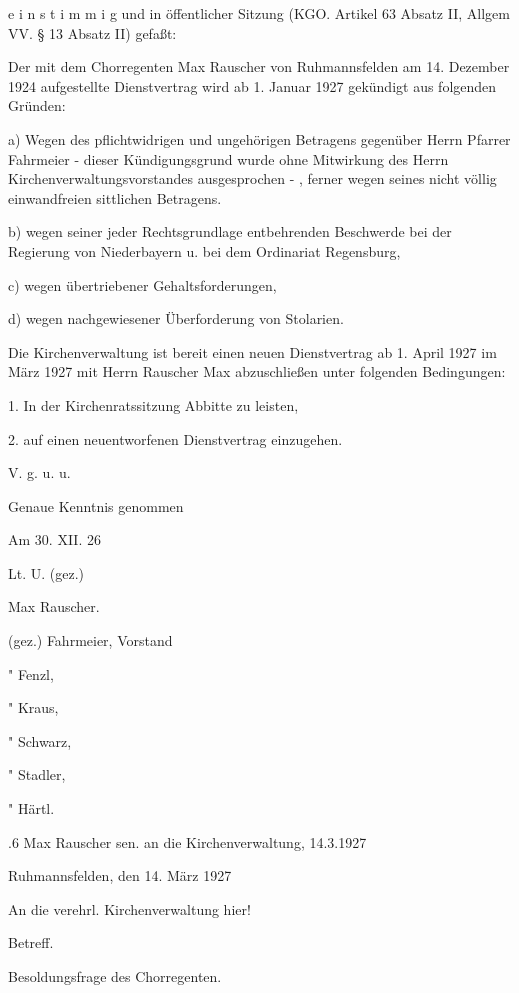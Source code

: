 \documentclass[12pt,a4pager]{book}
\begin{document}
e i n s t i m m i g und in öffentlicher Sitzung (KGO. Artikel 63 Absatz II,
Allgem VV. § 13 Absatz II) gefaßt:



Der mit dem Chorregenten Max Rauscher von Ruhmannsfelden am 14. Dezember 1924
aufgestellte Dienstvertrag wird ab 1. Januar 1927 gekündigt aus folgenden
Gründen:

a) Wegen des pflichtwidrigen und ungehörigen Betragens gegenüber Herrn Pfarrer
Fahrmeier - dieser  Kündigungsgrund wurde ohne Mitwirkung des Herrn
Kirchenverwaltungsvorstandes ausgesprochen - , ferner wegen seines nicht völlig
einwandfreien sittlichen Betragens.

b) wegen seiner jeder Rechtsgrundlage entbehrenden Beschwerde bei der Regierung
von Niederbayern u. bei dem Ordinariat Regensburg,

c) wegen übertriebener Gehaltsforderungen,

d) wegen nachgewiesener Überforderung von Stolarien.

Die Kirchenverwaltung ist bereit einen neuen Dienstvertrag ab 1. April 1927 im
März 1927 mit Herrn Rauscher Max abzuschließen unter folgenden Bedingungen:

1. In der Kirchenratssitzung Abbitte zu leisten,

2. auf einen neuentworfenen Dienstvertrag einzugehen.

V. g. u. u.



Genaue Kenntnis genommen

Am 30. XII. 26

Lt. U. (gez.)

Max Rauscher.



(gez.) Fahrmeier, Vorstand

   "     Fenzl,

   "     Kraus,

   "     Schwarz,

   "     Stadler,

   "     Härtl.

.6 Max Rauscher sen. an die Kirchenverwaltung, 14.3.1927

Ruhmannsfelden, den 14. März 1927



An die verehrl. Kirchenverwaltung hier!



Betreff.

Besoldungsfrage des Chorregenten.
\end{document}
